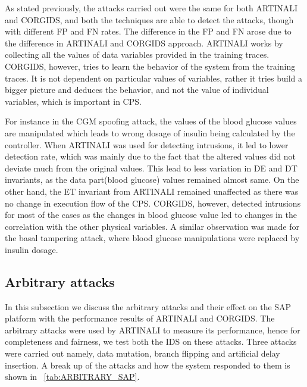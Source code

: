 As stated previously, the attacks carried out were the same for both ARTINALI and \ac{CORGIDS}, and both the techniques are able to detect the attacks, though with different \ac{FP} and \ac{FN} rates. The difference in the \ac{FP} and \ac{FN} arose due to the difference in ARTINALI and \ac{CORGIDS} approach. ARTINALI works by collecting all the values of data variables provided in the training traces. \ac{CORGIDS}, however, tries to learn the behavior of the system from the training traces. It is not dependent on particular values of variables, rather it tries build a bigger picture and deduces the behavior, and not the value of individual variables, which is important in \ac{CPS}. 

For instance in the \ac{CGM} spoofing attack, the values of the blood glucose values are manipulated which leads to wrong dosage of insulin being calculated by the controller. When ARTINALI was used for detecting intrusions, it led to lower detection rate, which was mainly due to the fact that the altered values did not deviate much from the original values. This lead to less variation in D\textbar E and D\textbar T invariants, as the data part(blood glucose) values remained almost same. On the other hand, the E\textbar T invariant from ARTINALI remained unaffected as there was no change in execution flow of the \ac{CPS}. \ac{CORGIDS}, however, detected intrusions for most of the cases as the changes in blood glucose value led to changes in the correlation with the other physical variables. A similar observation was made for the basal tampering attack, where blood glucose manipulations were replaced by insulin dosage.


\subsection{Arbitrary attacks}
In this subsection we discuss the arbitrary attacks and their effect on the \ac{SAP} platform with the performance results of ARTINALI and \ac{CORGIDS}. The arbitrary attacks were used by ARTINALI to measure its performance, hence for completeness and fairness, we test both the \ac{IDS} on these attacks. Three attacks were carried out namely, data mutation, branch flipping and artificial delay insertion. A break up of the attacks and how the system responded to them is shown in ~\autoref{tab:ARBITRARY_SAP}.

\begin{table}
\centering
  \caption{Arbitrary attacks on \ac{SAP} platform and its response}
  \label{tab:ARBITRARY_SAP}
\end{table}

